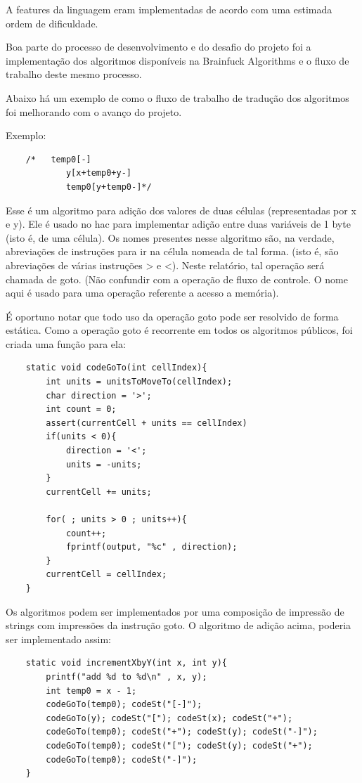 A features da linguagem eram implementadas de acordo com uma estimada ordem de dificuldade.
	
Boa parte do processo de desenvolvimento e do desafio do projeto foi a implementação dos algoritmos disponíveis na Brainfuck Algorithms e o fluxo de trabalho deste mesmo processo.
	
Abaixo há um exemplo de como o fluxo de trabalho de tradução dos algoritmos foi melhorando com o avanço do projeto.

Exemplo:

\begin{verbatim}
    /*   temp0[-]
            y[x+temp0+y-]
            temp0[y+temp0-]*/
\end{verbatim}

Esse é um algoritmo para adição dos valores de duas células (representadas por x e y). Ele é usado no hac para implementar adição entre duas variáveis de 1 byte (isto é, de uma célula). Os nomes presentes nesse algoritmo são, na verdade, abreviações de instruções para ir na célula nomeada de tal forma. (isto é, são abreviações de várias instruções > e <). Neste relatório, tal operação será chamada de goto. (Não confundir com a operação de fluxo de controle. O nome aqui é usado para uma operação referente a acesso a memória). 

É oportuno notar que todo uso da operação goto pode ser resolvido de forma estática. Como a operação goto é recorrente em todos os algoritmos públicos, foi criada uma função para ela:

\begin{verbatim}
    static void codeGoTo(int cellIndex){
        int units = unitsToMoveTo(cellIndex);
        char direction = '>';
        int count = 0;
        assert(currentCell + units == cellIndex)
        if(units < 0){
            direction = '<';
            units = -units;
        }
        currentCell += units;
        
        for( ; units > 0 ; units++){
            count++;
            fprintf(output, "%c" , direction);
        }
        currentCell = cellIndex;
    }
\end{verbatim}

Os algoritmos podem ser implementados por uma composição de impressão de strings com impressões da instrução goto. O algoritmo de adição acima, poderia ser implementado assim:

\begin{verbatim}
    static void incrementXbyY(int x, int y){
        printf("add %d to %d\n" , x, y);
        int temp0 = x - 1;
        codeGoTo(temp0); codeSt("[-]");
        codeGoTo(y); codeSt("["); codeSt(x); codeSt("+");
        codeGoTo(temp0); codeSt("+"); codeSt(y); codeSt("-]");
        codeGoTo(temp0); codeSt("["); codeSt(y); codeSt("+");
        codeGoTo(temp0); codeSt("-]");
    }
\end{verbatim}

